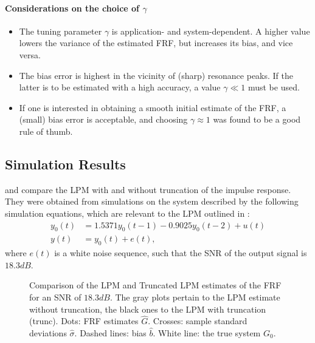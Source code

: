 \paragraph*{Considerations on the choice of $\gamma$}

\begin{itemize}
\item The tuning parameter $\gamma$ is application- and system-dependent.  A higher value lowers the variance of the estimated \gls{FRF}, but increases its bias, and vice versa.

\item The bias error is highest in the vicinity of (sharp) resonance peaks. 
If the latter is to be estimated with a high accuracy, a value $\gamma \ll 1$ must be used.

\item If one is interested in obtaining a smooth initial estimate of the \gls{FRF}, a (small) bias error is acceptable, and choosing $\gamma \approx 1$ was found to be a good rule of thumb.
\end{itemize}

\subsection{Simulation Results}\label{se:simResults}

 and  compare the \gls{LPM} with and without truncation of the impulse response.
They were obtained from simulations on  the system described by the following simulation equations, which are relevant to the \gls{LPM} outlined in :
\begin{subequations}
\label{eq:systemSimulations}
\begin{align}
y_0(t)  &= 1.5371y_0(t-1)    -0.9025y_0(t-2) + u(t)
\\
y(t) &= y_0(t) + e(t),
\end{align}
\end{subequations}
where $e(t)$ is a white noise sequence, such that the \gls{SNR} of the output signal is $18.3\unit{dB}$.


\begin{figure}
    \centering
    \remakeNextFigure
    \setlength{}
    \setlength\figureheight{0.68\figurewidth}
    
    \caption[Comparison of FRF estimated using LPM and Truncated LPM.]{Comparison of the \gls{LPM} and Truncated \gls{LPM} estimates of the \gls{FRF} for an \gls{SNR} of $18.3\unit{dB}$. The gray plots pertain to the \gls{LPM} estimate without truncation, the black ones to the \gls{LPM} with truncation (trunc). Dots: \gls{FRF} estimates $\hat{G}$. Crosses: sample standard deviations $\hat{\sigma}$. Dashed lines: bias $\hat{b}$. White line: the true system $G_0$.}
    \label{figLPMvsTrunc}
\end{figure}


